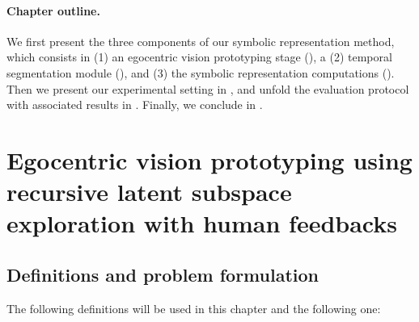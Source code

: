    \paragraph{Chapter outline.\\}
    
    We first present the three components of our symbolic representation method, which consists in (1) an egocentric vision prototyping stage (), a (2) temporal segmentation module (), and (3) the symbolic representation computations (). Then we present our experimental setting in , and unfold the evaluation protocol with associated results in . Finally, we conclude in .

\section{Egocentric vision prototyping using recursive latent subspace exploration with human feedbacks}
    \label{sec:chapter_5_prototyping}

    \subsection{Definitions and problem formulation}

    The following definitions will be used in this chapter and the following one:

